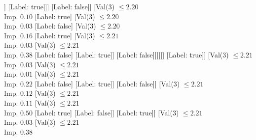 \documentclass[margin=10pt]{standalone}
\begin{document}
\begin{forest}
																						[Val($3$) $ \leq 2.21$ \\ Imp. $0.08$
																							[Val($3$) $ \leq 2.20$ \\ Imp. $0.01$
																								[Val($3$) $ \leq 2.20$ \\ Imp. $0.02$
																									[Val($3$) $ \leq 2.20$ \\ Imp. $0.11$
																										[Label: false]
																										[Val($3$) $ \leq 2.20$ \\ Imp. $0.11$
																											[Val($3$) $ \leq 2.20$ \\ Imp. $0.50$
																												[Label: true]
																												[Label: false]]
																											[Label: true]]]
																									[Label: false]]
																								[Val($3$) $ \leq 2.20$ \\ Imp. $0.10$
																									[Label: true]
																									[Val($3$) $ \leq 2.20$ \\ Imp. $0.03$
																										[Label: false]
																										[Val($3$) $ \leq 2.20$ \\ Imp. $0.16$
																											[Label: true]
																											[Val($3$) $ \leq 2.21$ \\ Imp. $0.03$
																												[Val($3$) $ \leq 2.21$ \\ Imp. $0.38$
																													[Label: false]
																													[Label: true]]
																												[Label: false]]]]]]
																							[Label: true]]
																						[Val($3$) $ \leq 2.21$ \\ Imp. $0.03$
																							[Val($3$) $ \leq 2.21$ \\ Imp. $0.01$
																								[Val($3$) $ \leq 2.21$ \\ Imp. $0.22$
																									[Label: false]
																									[Label: true]]
																								[Label: false]]
																							[Val($3$) $ \leq 2.21$ \\ Imp. $0.12$
																								[Val($3$) $ \leq 2.21$ \\ Imp. $0.11$
																									[Val($3$) $ \leq 2.21$ \\ Imp. $0.50$
																										[Label: true]
																										[Label: false]]
																									[Label: true]]
																								[Val($3$) $ \leq 2.21$ \\ Imp. $0.03$
																									[Val($3$) $ \leq 2.21$ \\ Imp. $0.38$

\end{forest}
\end{document}
